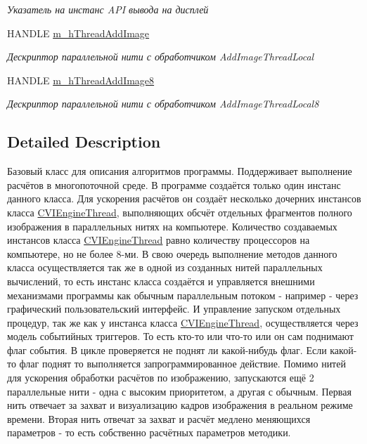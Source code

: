 \begin{DoxyCompactItemize}
\begin{DoxyCompactList}\small\item\em Указатель на инстанс A\+P\+I вывода на дисплей \end{DoxyCompactList}\item 
H\+A\+N\+D\+L\+E \hyperlink{class_c_v_i_engine_base_a4d289b3028ab2b3c1a91bf08de42144e}{m\+\_\+h\+Thread\+Add\+Image}
\begin{DoxyCompactList}\small\item\em Дескриптор параллельной нити с обработчиком Add\+Image\+Thread\+Local \end{DoxyCompactList}\item 
H\+A\+N\+D\+L\+E \hyperlink{class_c_v_i_engine_base_a81b0c7b485feb8404fa06b2e91300d14}{m\+\_\+h\+Thread\+Add\+Image8}
\begin{DoxyCompactList}\small\item\em Дескриптор параллельной нити с обработчиком Add\+Image\+Thread\+Local8 \end{DoxyCompactList}\end{DoxyCompactItemize}


\subsection{Detailed Description}
Базовый класс для описания алгоритмов программы. Поддерживает выполнение расчётов в многопоточной среде. В программе создаётся только один инстанс данного класса. Для ускорения расчётов он создаёт несколько дочерних инстансов класса \hyperlink{class_c_v_i_engine_thread}{C\+V\+I\+Engine\+Thread}, выполняющих обсчёт отдельных фрагментов полного изображения в параллельных нитях на компьютере. Количество создаваемых инстансов класса \hyperlink{class_c_v_i_engine_thread}{C\+V\+I\+Engine\+Thread} равно количеству процессоров на компьютере, но не более 8-\/ми. В свою очередь выполнение методов данного класса осуществляется так же в одной из созданных нитей параллельных вычислений, то есть инстанс класса создаётся и управляется внешними механизмами программы как обычным параллельным потоком -\/ например -\/ через графический пользовательский интерфейс. И управление запуском отдельных процедур, так же как у инстанса класса \hyperlink{class_c_v_i_engine_thread}{C\+V\+I\+Engine\+Thread}, осуществляется через модель событийных триггеров. То есть кто-\/то или что-\/то или он сам поднимают флаг события. В цикле проверяется не поднят ли какой-\/нибудь флаг. Если какой-\/то флаг поднят то выполняется запрограммированное действие. Помимо нитей для ускорения обработки расчётов по изображению, запускаются ещё 2 параллельные нити -\/ одна с высоким приоритетом, а другая с обычным. Первая нить отвечает за захват и визуализацию кадров изображения в реальном режиме времени. Вторая нить отвечат за захват и расчёт медлено меняющихся параметров -\/ то есть собственно расчётных параметров методики. 



